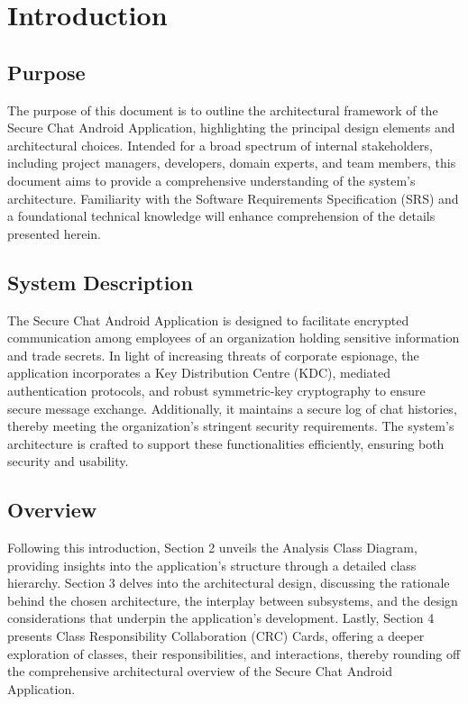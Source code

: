 \documentclass[]{article}
\begin{document}
\newpage
\section{Introduction}
\label{sec:introduction}


\subsection{Purpose}
\label{sub:purpose}
The purpose of this document is to outline the architectural framework of the Secure Chat Android Application, highlighting the principal design elements and architectural choices. Intended for a broad spectrum of internal stakeholders, including project managers, developers, domain experts, and team members, this document aims to provide a comprehensive understanding of the system’s architecture. Familiarity with the Software Requirements Specification (SRS) and a foundational technical knowledge will enhance comprehension of the details presented herein.

\subsection{System Description}
\label{sub:system_description}
The Secure Chat Android Application is designed to facilitate encrypted communication among employees of an organization holding sensitive information and trade secrets. In light of increasing threats of corporate espionage, the application incorporates a Key Distribution Centre (KDC), mediated authentication protocols, and robust symmetric-key cryptography to ensure secure message exchange. Additionally, it maintains a secure log of chat histories, thereby meeting the organization's stringent security requirements. The system's architecture is crafted to support these functionalities efficiently, ensuring both security and usability.


\subsection{Overview}
\label{sub:overview}
Following this introduction, Section 2 unveils the Analysis Class Diagram, providing insights into the application's structure through a detailed class hierarchy. Section 3 delves into the architectural design, discussing the rationale behind the chosen architecture, the interplay between subsystems, and the design considerations that underpin the application's development. Lastly, Section 4 presents Class Responsibility Collaboration (CRC) Cards, offering a deeper exploration of classes, their responsibilities, and interactions, thereby rounding off the comprehensive architectural overview of the Secure Chat Android Application.
\end{document}
